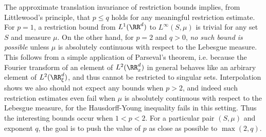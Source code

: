 The approximate translation invariance of restriction bounds implies, from Littlewood's principle, that $p \leq q$ holds for any meaningful restriction estimate. For $p = 1$, a restriction bound from $L^1(\RR^d)$ to $L^\infty(S,\mu)$ is trivial for any set $S$ and measure $\mu$. On the other hand, for $p = 2$ and $q > 0$, \emph{no such bound is possible} unless $\mu$ is absolutely continuous with respect to the Lebesgue measure. This follows from a simple application of Parseval's theorem, i.e. because the Fourier transform of an element of $L^2(\RR^d_x)$ in general behaves like an arbirary element of $L^2(\RR^d_\xi)$, and thus cannot be restricted to singular sets. Interpolation shows we also should not expect any bounds when $p > 2$, and indeed such restriction estimates even fail when $\mu$ is absolutely continuous with respect to the Lebesgue measure, for the Hausdorff-Young inequality fails in this setting. Thus the interesting bounds occur when $1 < p < 2$. For a particular pair $(S,\mu)$ and exponent $q$, the goal is to push the value of $p$ as close as possible to $\max(2,q)$.



